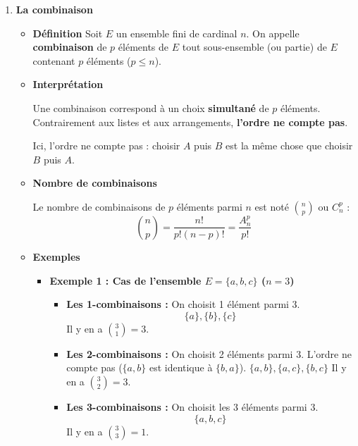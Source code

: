 \documentclass[12pt,a4paper]{article}
\begin{document}
\begin{enumerate}[label=\Roman*., font=\bfseries\color{red}]
\begin{enumerate}
\begin{enumerate}
\begin{itemize}
\begin{itemize}
\begin{itemize}
    \end{itemize}
    
\end{itemize}

\end{itemize}

\item \textbf{La combinaison}
\begin{itemize}
    \item \textbf{Définition}
Soit \( E \) un ensemble fini de cardinal \( n \).
On appelle \textbf{combinaison} de \( p \) éléments de \( E \) tout sous-ensemble (ou partie) de \( E \) contenant \( p \) éléments ($p \leq n$).
\item \textbf{Interprétation}

Une combinaison correspond à un choix \textbf{simultané} de \( p \) éléments. Contrairement aux listes et aux arrangements, \textbf{l'ordre ne compte pas}.

Ici, l’ordre ne compte pas : choisir \( A \) puis \( B \) est la même chose que choisir \( B \) puis \( A \).
 
\item \textbf{Nombre de combinaisons}

Le nombre de combinaisons de \( p \) éléments parmi \( n \) est noté \( \binom{n}{p} \) ou \( C_n^p \) :
\[
\binom{n}{p} = \frac{n!}{p!(n-p)!} = \frac{A_n^p}{p!}
\]
\item \textbf{Exemples}

\begin{itemize}
    \item \textbf{Exemple 1 : Cas de l'ensemble $E = \{a, b, c\}$ ($n=3$)}
    
    \begin{itemize}
        \item \textbf{Les 1-combinaisons :} On choisit 1 élément parmi 3.
        \[ \{a\}, \{b\}, \{c\} \]
        Il y en a $\binom{3}{1} = 3$.
        
        \item \textbf{Les 2-combinaisons :} On choisit 2 éléments parmi 3. L'ordre ne compte pas ($\{a,b\}$ est identique à $\{b,a\}$).
        \( \{a,b\}, \{a,c\}, \{b,c\} \)
        Il y en a $\binom{3}{2} = 3$.
        
        \item \textbf{Les 3-combinaisons :} On choisit les 3 éléments parmi 3.
        \[ \{a,b,c\} \]
        Il y en a $\binom{3}{3} = 1$.
    \end{itemize}


\end{itemize}
\end{itemize}
\end{enumerate}
\end{enumerate}
\end{enumerate}
\end{document}
